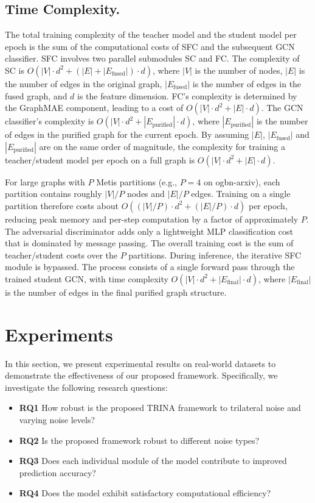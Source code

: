 \documentclass[sigconf, anonymous, review]{acmart}
\begin{document}
  \subsection{Time Complexity.}
    The total training complexity of the teacher model and the student model per epoch is the sum of the computational costs of SFC and the subsequent GCN classifier. SFC involves two parallel submodules SC and FC. The complexity of SC is $O(|V|\cdot d^2 + (|E| + |E_{\text{fused}}|)\cdot d)$, where $|V|$ is the number of nodes, $|E|$ is the number of edges in the original graph, $|E_{\text{fused}}|$ is the number of edges in the fused graph, and $d$ is the feature dimension. FC's complexity is determined by the GraphMAE component, leading to a cost of $O(|V|\cdot d^2 + |E|\cdot d)$. The GCN classifier's complexity is $O(|V|\cdot d^2 + |E_{\text{purified}}|\cdot d)$, where $|E_{\text{purified}}|$ is the number of edges in the purified graph for the current epoch. By assuming $|E|$, $|E_{\text{fused}}|$ and $|E_{\text{purified}}|$ are on the same order of magnitude, the complexity for training a teacher/student model per epoch on a full graph is $O(|V|\cdot d^2 + |E|\cdot d)$.

    For large graphs with $P$ Metis partitions (e.g., $P{=}4$ on ogbn-arxiv), each partition contains roughly $|V|/P$ nodes and $|E|/P$ edges. Training on a single partition therefore costs about $O((|V|/P)\cdot d^2 + (|E|/P)\cdot d)$ per epoch, reducing peak memory and per-step computation by a factor of approximately $P$. The adversarial discriminator adds only a lightweight MLP classification cost that is dominated by message passing. The overall training cost is the sum of teacher/student costs over the $P$ partitions. During inference, the iterative SFC module is bypassed. The process consists of a single forward pass through the trained student GCN, with time complexity $O(|V|\cdot d^2 + |E_{\text{final}}|\cdot d)$, where $|E_{\text{final}}|$ is the number of edges in the final purified graph structure.

\section{Experiments}
  In this section, we present experimental results on real-world datasets to demonstrate the effectiveness of our proposed framework. Specifically, we investigate the following research questions:
  \begin{itemize}
    \item \textbf{RQ1} How robust is the proposed TRINA framework to trilateral noise and varying noise levels?
    \item \textbf{RQ2} Is the proposed framework robust to different noise types?
    \item \textbf{RQ3} Does each individual module of the model contribute to improved prediction accuracy?
    \item \textbf{RQ4} Does the model exhibit satisfactory computational efficiency?
  \end{itemize}
\end{document}
